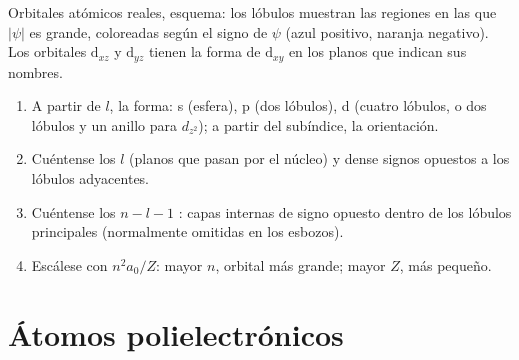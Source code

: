 \begin{omfigure}

{\small Orbitales atómicos reales, esquema: los lóbulos muestran las regiones en las que $|\psi|$
es grande, coloreadas según el signo de $\psi$ (azul positivo, naranja negativo). Los
orbitales $\mathrm d_{xz}$ y $\mathrm d_{yz}$ tienen la forma de $\mathrm d_{xy}$ en
los planos que indican sus nombres.}
\end{omfigure}

\begin{method}\label{met:b2:atomic-orbitals:draw-orbital}
\begin{enumerate}
  \item A partir de $l$, la forma: s (esfera), p (dos lóbulos), d (cuatro lóbulos, o dos
        lóbulos y un anillo para $d_{z^2}$); a partir del subíndice, la orientación.
  \item Cuéntense los $l$  (planos que pasan por el núcleo) y dense
        signos opuestos a los lóbulos adyacentes.
  \item Cuéntense los $n - l - 1$ : capas internas de signo opuesto dentro
        de los lóbulos principales (normalmente omitidas en los esbozos).
  \item Escálese con $n^2a_0/Z$: mayor $n$, orbital más grande; mayor $Z$, más pequeño.
\end{enumerate}
\end{method}

\section{Átomos polielectrónicos}

